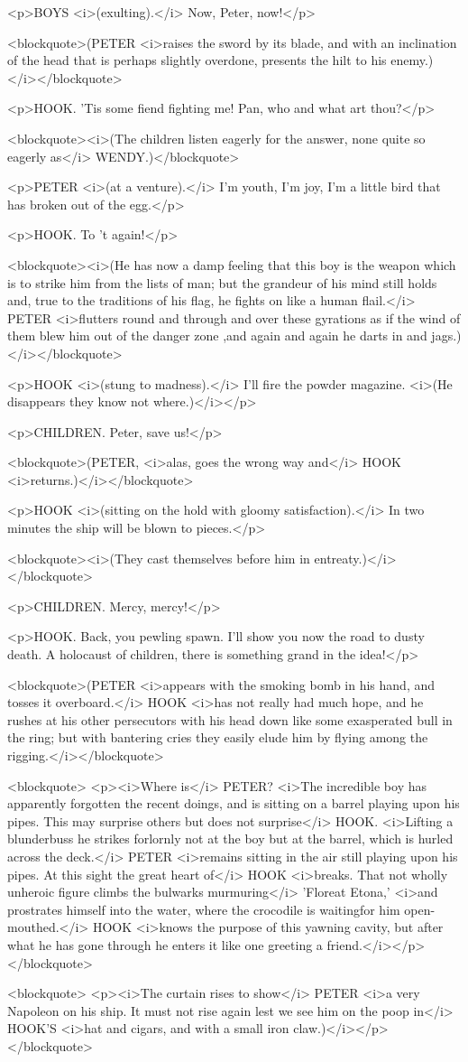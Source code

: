 <p>BOYS <i>(exulting).</i> Now, Peter, now!</p>

<blockquote>(PETER <i>raises the sword by its blade, and with an inclination of the head that is perhaps slightly overdone, presents the hilt to his enemy.)</i></blockquote>

<p>HOOK. 'Tis some fiend fighting me! Pan, who and what art thou?</p>

<blockquote><i>(The children listen eagerly for the answer, none quite so eagerly as</i> WENDY.)</blockquote>

<p>PETER <i>(at a venture).</i> I'm youth, I'm joy, I'm a little bird that has broken out of the egg.</p>

<p>HOOK. To 't again!</p>

<blockquote><i>(He has now a damp feeling that this boy is the weapon which is to strike him from the lists of man; but the grandeur of his mind still holds and, true to the traditions of his flag, he fights on like a human flail.</i> PETER <i>flutters round and through and over these gyrations as if the wind of them blew him out of the danger zone ,and again and again he darts in and jags.)</i></blockquote>

<p>HOOK <i>(stung to madness).</i> I'll fire the powder magazine. <i>(He disappears they know not where.)</i></p>

<p>CHILDREN. Peter, save us!</p>

<blockquote>(PETER, <i>alas, goes the wrong way and</i> HOOK <i>returns.)</i></blockquote>

<p>HOOK <i>(sitting on the hold with gloomy satisfaction).</i> In two minutes the ship will be blown to pieces.</p>

<blockquote><i>(They cast themselves before him in entreaty.)</i></blockquote>

<p>CHILDREN. Mercy, mercy!</p>

<p>HOOK. Back, you pewling spawn. I'll show you now the road to dusty death. A holocaust of children, there is something grand in the idea!</p>

<blockquote>(PETER <i>appears with the smoking bomb in his hand, and tosses it overboard.</i> HOOK <i>has not really had much hope, and he rushes at his other persecutors with his head down like some exasperated bull in the ring; but with bantering cries they easily elude him by flying among the rigging.</i></blockquote>

<blockquote> <p><i>Where is</i> PETER? <i>The incredible boy has apparently forgotten the recent doings, and is sitting on a barrel playing upon his pipes. This may surprise others but does not surprise</i> HOOK. <i>Lifting a blunderbuss he strikes forlornly not at the boy but at the barrel, which is hurled across the deck.</i> PETER <i>remains sitting in the air still playing upon his pipes. At this sight the great heart of</i> HOOK <i>breaks. That not wholly unheroic figure climbs the bulwarks murmuring</i> 'Floreat Etona,' <i>and prostrates himself into the water, where the crocodile is waitingfor him open-mouthed.</i> HOOK <i>knows the purpose of this yawning cavity, but after what he has gone through he enters it like one greeting a friend.</i></p> </blockquote>

<blockquote> <p><i>The curtain rises to show</i> PETER <i>a very Napoleon on his ship. It must not rise again lest we see him on the poop in</i> HOOK'S <i>hat and cigars, and with a small iron claw.)</i></p> </blockquote>
